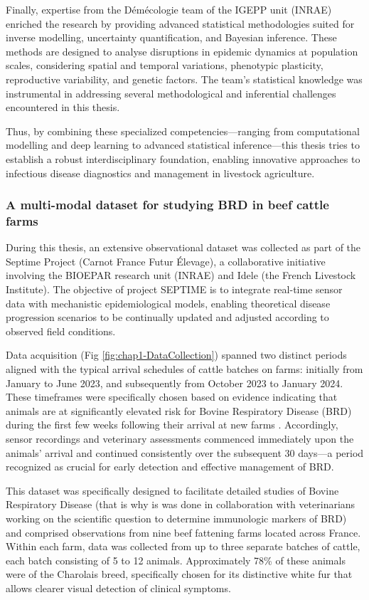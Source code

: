 Finally, expertise from the Démécologie team of the IGEPP unit (INRAE) enriched the research by providing advanced statistical methodologies suited for inverse modelling, uncertainty quantification, and Bayesian inference. These methods are designed to analyse disruptions in epidemic dynamics at population scales, considering spatial and temporal variations, phenotypic plasticity, reproductive variability, and genetic factors. The team's statistical knowledge was instrumental in addressing several methodological and inferential challenges encountered in this thesis.

Thus, by combining these specialized competencies—ranging from computational modelling and deep learning to advanced statistical inference—this thesis tries to establish a robust interdisciplinary foundation, enabling innovative approaches to infectious disease diagnostics and management in livestock agriculture.

\subsubsection{A multi-modal dataset for studying BRD in beef cattle farms}

During this thesis, an extensive observational dataset was collected as part of the Septime Project (Carnot France Futur Élevage), a collaborative initiative involving the BIOEPAR research unit (INRAE) and Idele (the French Livestock Institute). The objective of project SEPTIME is to integrate real-time sensor data with mechanistic epidemiological models, enabling theoretical disease progression scenarios to be continually updated and adjusted according to observed field conditions.

Data acquisition (Fig \ref{fig:chap1-DataCollection}) spanned two distinct periods aligned with the typical arrival schedules of cattle batches on farms: initially from January to June 2023, and subsequently from October 2023 to January 2024. These timeframes were specifically chosen based on evidence indicating that animals are at significantly elevated risk for Bovine Respiratory Disease (BRD) during the first few weeks following their arrival at new farms \cite{assie_exposure_2009}. Accordingly, sensor recordings and veterinary assessments commenced immediately upon the animals' arrival and continued consistently over the subsequent 30 days—a period recognized as crucial for early detection and effective management of BRD.

This dataset was specifically designed to facilitate detailed studies of Bovine Respiratory Disease (that is why is was done in collaboration with veterinarians working on the scientific question to determine immunologic markers of BRD) and comprised observations from nine beef fattening farms located across France. Within each farm, data was collected from up to three separate batches of cattle, each batch consisting of 5 to 12 animals. Approximately 78\% of these animals were of the Charolais breed, specifically chosen for its distinctive white fur that allows clearer visual detection of clinical symptoms.

